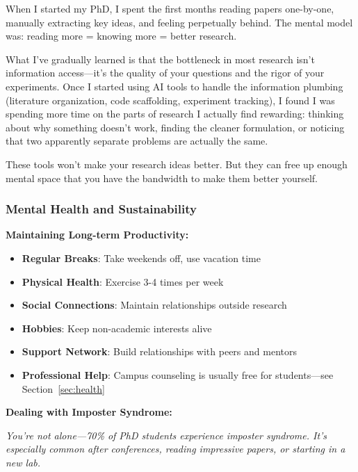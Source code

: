 \documentclass[11pt,a4paper]{article}
\begin{document}
\begin{tcolorbox}[colback=purple!5,colframe=royalpurple,title={Personal Reflection: Redefining What ``Doing Research'' Means}]
When I started my PhD, I spent the first months reading papers one-by-one, manually extracting key ideas, and feeling perpetually behind. The mental model was: reading more = knowing more = better research.

What I've gradually learned is that the bottleneck in most research isn't information access---it's the quality of your questions and the rigor of your experiments. Once I started using AI tools to handle the information plumbing (literature organization, code scaffolding, experiment tracking), I found I was spending more time on the parts of research I actually find rewarding: thinking about why something doesn't work, finding the cleaner formulation, or noticing that two apparently separate problems are actually the same.

These tools won't make your research ideas better. But they can free up enough mental space that you have the bandwidth to make them better yourself.
\end{tcolorbox}

\subsubsection{Mental Health and Sustainability}

\textbf{Maintaining Long-term Productivity:}
\begin{itemize}
    \item \textbf{Regular Breaks}: Take weekends off, use vacation time
    \item \textbf{Physical Health}: Exercise 3-4 times per week
    \item \textbf{Social Connections}: Maintain relationships outside research
    \item \textbf{Hobbies}: Keep non-academic interests alive
    \item \textbf{Support Network}: Build relationships with peers and mentors
    \item \textbf{Professional Help}: Campus counseling is usually free for students---see Section~\ref{sec:health}
\end{itemize}

\textbf{Dealing with Imposter Syndrome:}

\textit{You're not alone—70\% of PhD students experience imposter syndrome. It's especially common after conferences, reading impressive papers, or starting in a new lab.}
\end{document}
